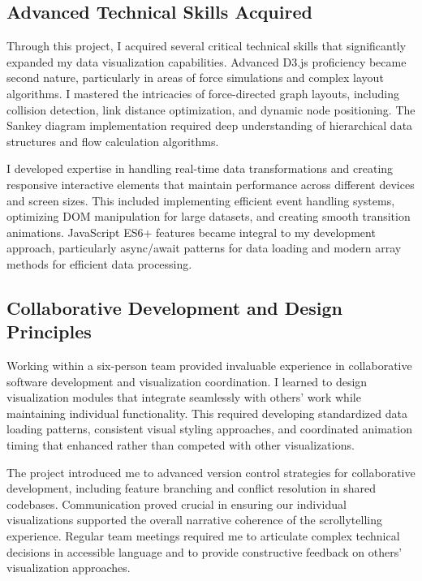 \documentclass[conference]{IEEEtran}
\begin{document}
\subsection{Advanced Technical Skills Acquired}

Through this project, I acquired several critical technical skills that significantly expanded my data visualization capabilities. Advanced D3.js proficiency became second nature, particularly in areas of force simulations and complex layout algorithms. I mastered the intricacies of force-directed graph layouts, including collision detection, link distance optimization, and dynamic node positioning. The Sankey diagram implementation required deep understanding of hierarchical data structures and flow calculation algorithms.

I developed expertise in handling real-time data transformations and creating responsive interactive elements that maintain performance across different devices and screen sizes. This included implementing efficient event handling systems, optimizing DOM manipulation for large datasets, and creating smooth transition animations. JavaScript ES6+ features became integral to my development approach, particularly async/await patterns for data loading and modern array methods for efficient data processing.

\subsection{Collaborative Development and Design Principles}

Working within a six-person team provided invaluable experience in collaborative software development and visualization coordination. I learned to design visualization modules that integrate seamlessly with others' work while maintaining individual functionality. This required developing standardized data loading patterns, consistent visual styling approaches, and coordinated animation timing that enhanced rather than competed with other visualizations.

The project introduced me to advanced version control strategies for collaborative development, including feature branching and conflict resolution in shared codebases. Communication proved crucial in ensuring our individual visualizations supported the overall narrative coherence of the scrollytelling experience. Regular team meetings required me to articulate complex technical decisions in accessible language and to provide constructive feedback on others' visualization approaches.
\end{document}
